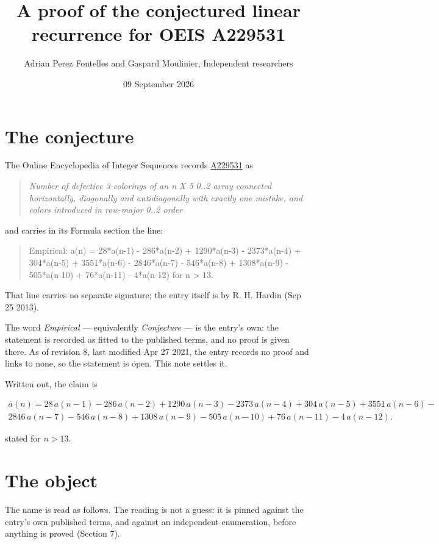 \documentclass[11pt]{article}
\title{A proof of the conjectured linear recurrence for OEIS A229531}
\author{Adrian Perez Fontelles and Gaspard Moulinier, Independent researchers}
\date{09 September 2026}
\theoremstyle{definition}
\begin{document}
\maketitle
\section{The conjecture}

The Online Encyclopedia of Integer Sequences records \href{https://oeis.org/A229531}{A229531} as

\begin{quote}\itshape Number of defective 3-colorings of an n X 5 0..2 array connected horizontally, diagonally and antidiagonally with exactly one mistake, and colors introduced in row-major 0..2 order\end{quote}

and carries in its Formula section the line:

\begin{quote}\ttfamily Empirical: a(n) = 28*a(n-1) - 286*a(n-2) + 1290*a(n-3) - 2373*a(n-4) + 304*a(n-5) + 3551*a(n-6) - 2846*a(n-7) - 546*a(n-8) + 1308*a(n-9) - 505*a(n-10) + 76*a(n-11) - 4*a(n-12) for n > 13.\end{quote}

That line carries no separate signature; the entry itself is by R. H. Hardin (Sep 25 2013).

The word {\itshape Empirical} --- equivalently {\itshape Conjecture} --- is the entry's own: the statement is recorded as fitted to the published terms, and no proof is given there. As of revision 8, last modified Apr 27 2021, the entry records no proof and links to none, so the statement is open. This note settles it.

Written out, the claim is

\begin{multline*} a(n) = 28\,a(n-1) - 286\,a(n-2) + 1290\,a(n-3) - 2373\,a(n-4) + 304\,a(n-5) + 3551\,a(n-6) - \\ 2846\,a(n-7) - 546\,a(n-8) + 1308\,a(n-9) - 505\,a(n-10) + 76\,a(n-11) - 4\,a(n-12). \end{multline*}

stated for $n > 13$.

\section{The object}

The name is read as follows. The reading is not a guess: it is pinned against the entry's own published terms, and against an independent enumeration, before anything is proved (Section 7).
\end{document}
